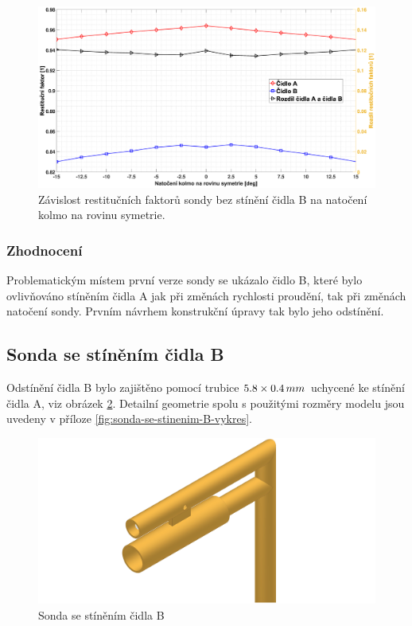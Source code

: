              \begin{figure}[ht!]
                \centering
                \includegraphics*[width=\textwidth, trim={5.9cm 1.0cm 2.7cm 2.0cm}]{400_SIMULACE_KONSTRUKCNICH_UPRAV/Grafy/01_kolma_rovina}
                \caption{Závislost restitučních faktorů sondy bez stínění čidla B na natočení kolmo na rovinu symetrie.}
                \label{fig:sonda-bez-stineni-kolma-rovina}
            \end{figure}

        \subsubsection{Zhodnocení}
            Problematickým místem první verze sondy se ukázalo čidlo B, které bylo ovlivňováno stíněním čidla A jak při změnách rychlosti proudění, tak při změnách natočení sondy. Prvním návrhem konstrukční úpravy tak bylo jeho odstínění.
    \newpage
    \subsection{Sonda se stíněním čidla B}
        Odstínění čidla B bylo zajištěno pomocí trubice $5.8 \times 0.4 \, mm$ uchycené ke stínění čidla A, viz obrázek \ref{fig:sonda-se-stinenim-B}. Detailní geometrie spolu s použitými rozměry modelu jsou uvedeny v příloze \ref{fig:sonda-se-stinenim-B-vykres}. 
        
        \begin{figure}[ht!]
            \centering
            \includegraphics[width=\textwidth]{400_SIMULACE_KONSTRUKCNICH_UPRAV/Vykresy_rendery/Sonda_se_stinenim_B.png}
            \caption{Sonda se stíněním čidla B}
            \label{fig:sonda-se-stinenim-B}
        \end{figure}

